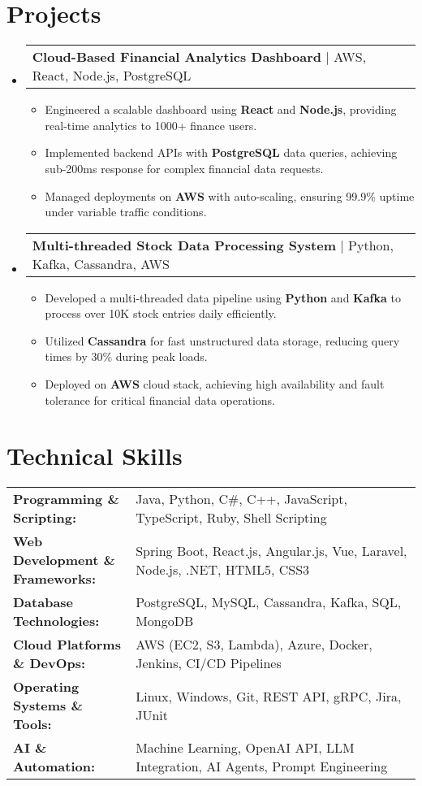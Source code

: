 \documentclass[letterpaper,11pt]{article}
\makeatletter
\newcommand{\resumeItem}[1]{
  \item\footnotesize{
    {#1 \vspace{-2pt}}
  }
}
\newcommand{\resumeProjectHeading}[2]{
    \item
    \begin{tabular*}{1.001\textwidth}{l@{\extracolsep{\fill}}r}
      \small#1 & \textbf{\small #2}\\
    \end{tabular*}\vspace{-7pt}
}
\newcommand{\resumeSubHeadingListStart}{\begin{itemize}[leftmargin=0pt, label={}]}
\newcommand{\resumeSubHeadingListEnd}{\end{itemize}}
\newcommand{\resumeItemListStart}{\begin{itemize}[leftmargin=*]}
\newcommand{\resumeItemListEnd}{\end{itemize}\vspace{-5pt}}
\makeatother
\begin{document}
\section{Projects}
    \vspace{-5pt}
    \resumeSubHeadingListStart
      \resumeProjectHeading
          {\textbf{Cloud-Based Financial Analytics Dashboard} | AWS, React, Node.js, PostgreSQL}{}
          \resumeItemListStart
              \resumeItem{Engineered a scalable dashboard using \textbf{React} and \textbf{Node.js}, providing real-time analytics to 1000+ finance users.}
              \resumeItem{Implemented backend APIs with \textbf{PostgreSQL} data queries, achieving sub-200ms response for complex financial data requests.}
              \resumeItem{Managed deployments on \textbf{AWS} with auto-scaling, ensuring 99.9\% uptime under variable traffic conditions.}
          \resumeItemListEnd
          \vspace{-16pt}
      \resumeProjectHeading
          {\textbf{Multi-threaded Stock Data Processing System} | Python, Kafka, Cassandra, AWS}{}
          \resumeItemListStart
              \resumeItem{Developed a multi-threaded data pipeline using \textbf{Python} and \textbf{Kafka} to process over 10K stock entries daily efficiently.}
              \resumeItem{Utilized \textbf{Cassandra} for fast unstructured data storage, reducing query times by 30\% during peak loads.}
              \resumeItem{Deployed on \textbf{AWS} cloud stack, achieving high availability and fault tolerance for critical financial data operations.}
          \resumeItemListEnd
    \resumeSubHeadingListEnd
\vspace{-10pt}
\section{Technical Skills}
        \vspace{-14pt}
        \begin{table}[h]
            \footnotesize
            \begin{tabular}{p{0.3\linewidth} p{0.7\linewidth}}
                \textbf{Programming \& Scripting:} & Java, Python, C\#, C++, JavaScript, TypeScript, Ruby, Shell Scripting \\
                \textbf{Web Development \& Frameworks:} & Spring Boot, React.js, Angular.js, Vue, Laravel, Node.js, .NET, HTML5, CSS3 \\
                \textbf{Database Technologies:} & PostgreSQL, MySQL, Cassandra, Kafka, SQL, MongoDB \\
                \textbf{Cloud Platforms \& DevOps:} & AWS (EC2, S3, Lambda), Azure, Docker, Jenkins, CI/CD Pipelines \\
                \textbf{Operating Systems \& Tools:} & Linux, Windows, Git, REST API, gRPC, Jira, JUnit \\
                \textbf{AI \& Automation:} & Machine Learning, OpenAI API, LLM Integration, AI Agents, Prompt Engineering \\
            \end{tabular}
        \end{table}
\end{document}
